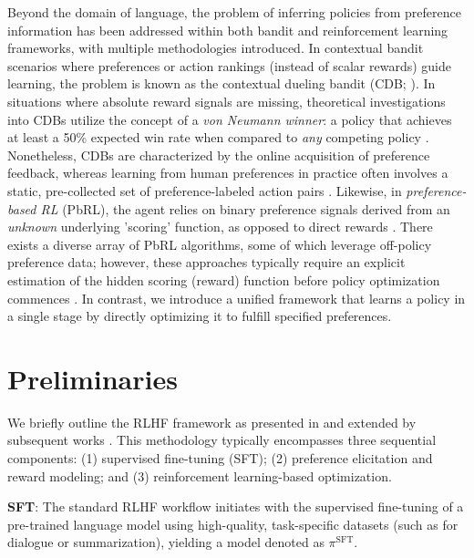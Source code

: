 Beyond the domain of language, the problem of inferring policies from preference information has been addressed within both bandit and reinforcement learning frameworks, with multiple methodologies introduced. In contextual bandit scenarios where preferences or action rankings (instead of scalar rewards) guide learning, the problem is known as the contextual dueling bandit (CDB; \cite{yue2012karmed,dudik2015contextual}). In situations where absolute reward signals are missing, theoretical investigations into CDBs utilize the concept of a \textit{von Neumann winner}: a policy that achieves at least a 50\% expected win rate when compared to \textit{any} competing policy \citep{dudik2015contextual}. Nonetheless, CDBs are characterized by the online acquisition of preference feedback, whereas learning from human preferences in practice often involves a static, pre-collected set of preference-labeled action pairs \citep{yan2022human}. Likewise, in \textit{preference-based RL} (PbRL), the agent relies on binary preference signals derived from an \textit{unknown} underlying 'scoring' function, as opposed to direct rewards \citep{BusaFekete2014,ruiz2023dueling}. There exists a diverse array of PbRL algorithms, some of which leverage off-policy preference data; however, these approaches typically require an explicit estimation of the hidden scoring (reward) function before policy optimization commences \citep{jain2013learning,BusaFekete2014,christiano2017deep,sadigh2017active,kupcsik2018learning}. In contrast, we introduce a unified framework that learns a policy in a single stage by directly optimizing it to fulfill specified preferences.

\section{Preliminaries}\label{section:prelims}

We briefly outline the RLHF framework as presented in \citeauthor{ziegler2020finetuning} and extended by subsequent works \citep{stiennon2022learning, bai2022training, ouyang2022training}. This methodology typically encompasses three sequential components: (1) supervised fine-tuning (SFT); (2) preference elicitation and reward modeling; and (3) reinforcement learning-based optimization.

\textbf{SFT}: The standard RLHF workflow initiates with the supervised fine-tuning of a pre-trained language model using high-quality, task-specific datasets (such as for dialogue or summarization), yielding a model denoted as $\pi^\text{SFT}$.


